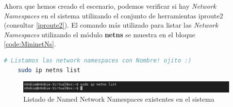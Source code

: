 Ahora que hemos creado el escenario, podemos verificar si hay \textit{Network Namespaces} en el sistema utilizando el conjunto de herramientas iproute2 (consultar \ref{iproute2}). El comando más utilizado para listar las \textit{Network Namespaces} utilizando el módulo \textbf{netns} se muestra en el bloque \ref{code:MininetNs}.


\begin{lstlisting}[language= bash, style=Consola, caption={Listar Named Network Namespaces},label=code:MininetNs]
    # Listamos las network namespaces con Nombre! ojito :)
    sudo ip netns list
\end{lstlisting}
\vspace{0.5cm}

\begin{figure}[ht]
    \centering
    \includegraphics[width=\textwidth]{archivos/img/teoria/mn_02.png}
    \caption{Listado de Named Network Namespaces existentes en el sistema}
    \label{fig:mininet_02}
\end{figure}



